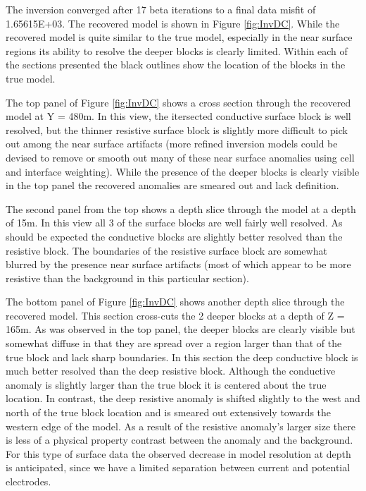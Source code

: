 The inversion converged after 17 beta iterations to a final data misfit of 1.65615E+03. The recovered model is shown in Figure \ref{fig:InvDC}. While the recovered model is quite similar to the true model, especially in the near surface regions its ability to resolve the deeper blocks is clearly limited. Within each of the sections presented the black outlines show the location of the blocks in the true model. 

The top panel of Figure \ref{fig:InvDC} shows a cross section through the recovered model at Y = 480m. In this view, the itersected conductive surface block is well resolved, but the thinner resistive surface block is slightly more difficult to pick out among the near surface artifacts (more refined inversion models could be devised to remove or smooth out many of these near surface anomalies using cell and interface weighting). While the presence of the deeper blocks is clearly visible in the top panel the recovered anomalies are smeared out and lack definition.

The second panel from the top shows a depth slice through the model at a depth of 15m. In this view all 3 of the surface blocks are well fairly well resolved. As should be expected the conductive blocks are slightly better resolved than the resistive block. The boundaries of the resistive surface block are somewhat blurred by the presence near surface artifacts (most of which appear to be more resistive than the background in this particular section). 

The bottom panel of Figure \ref{fig:InvDC} shows another depth slice through the recovered model. This section cross-cuts the 2 deeper blocks at a depth of Z = 165m. As was observed in the top panel, the deeper blocks are clearly visible but somewhat diffuse in that they are spread over a region larger than that of the true block and lack sharp boundaries. In this section the deep conductive block is much better resolved than the deep resistive block. Although the conductive anomaly is slightly larger than the true block it is centered about the true location. In contrast, the deep resistive anomaly is shifted slightly to the west and north of the true block location and is smeared out extensively towards the western edge of the model. As a result of the resistive anomaly's larger size there is less of a physical property contrast between the anomaly and the background. For this type of surface data the observed decrease in model resolution at depth is anticipated, since we have a limited separation between current and potential electrodes. 


